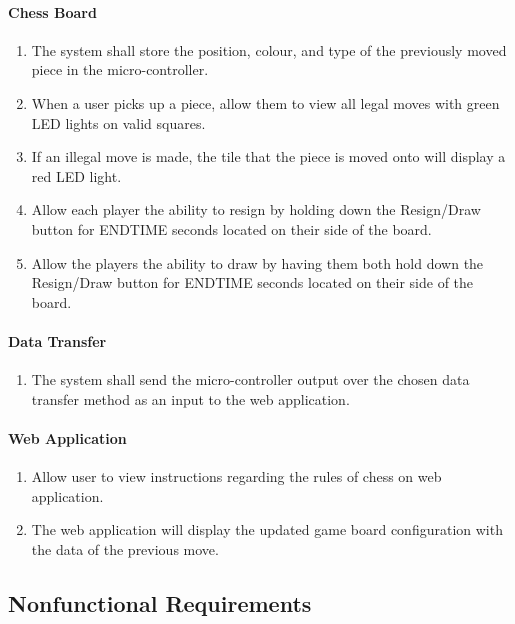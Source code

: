 \documentclass[12pt]{article}
\begin{document}
{\paragraph{Chess Board}
\begin{enumerate}[{BB}1., leftmargin=2\parindent]
    \item The system shall store the position, colour, and type of the previously moved piece in the micro-controller.
    \item When a user picks up a piece, allow them to view all legal moves with green LED lights on valid squares.
    \item If an illegal move is made, the tile that the piece is moved onto will display a red LED light.
    \item Allow each player the ability to resign by holding down the Resign/Draw button for ENDTIME seconds located on their side of the board.
    \item Allow the players the ability to draw by having them both hold down the Resign/Draw button for ENDTIME seconds located on their side of the board.
\end{enumerate}

\paragraph{Data Transfer}
\begin{enumerate}[{BD}1., leftmargin=2\parindent]
    \item The system shall send the micro-controller output over the chosen data transfer method as an input to the web application.
\end{enumerate}

\paragraph{Web Application}
\begin{enumerate}[{BA}1., leftmargin=2\parindent]
    \item Allow user to view instructions regarding the rules of chess on web application.
    \item The web application will display the updated game board configuration with the data of the previous move.
\end{enumerate}



\subsection{Nonfunctional Requirements}

}
\end{document}
